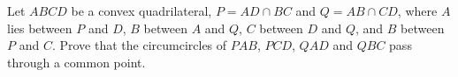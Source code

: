 Let $ABCD$ be a convex quadrilateral, $P=AD\cap BC$ and $Q=AB\cap CD$, where $A$ lies between $P$ and $D$, $B$ between $A$ and $Q$, $C$ between $D$ and $Q$, and $B$ between $P$ and $C$. Prove that the circumcircles of $PAB$, $PCD$, $QAD$ and $QBC$ pass through a common point.

